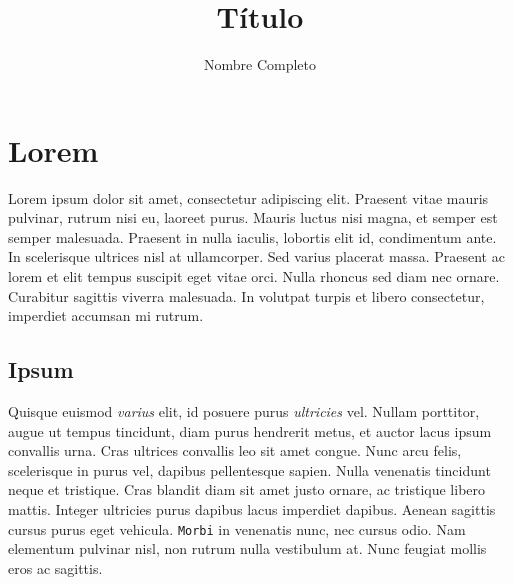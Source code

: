 \documentclass[a4paper,12pt]{article}
\title{Título}
\author{Nombre Completo}
\date{}
\begin{document}



\pagestyle{empty}
\renewcommand{\contentsname}{\centering Índice}
\tableofcontents
\newpage


\pagestyle{fancy}
\cfoot{\thepage}
\rhead{}
\renewcommand{\headrulewidth}{0pt}
\renewcommand{\footrulewidth}{0.4pt}



\section{Lorem}

Lorem ipsum dolor sit amet, consectetur adipiscing elit. Praesent vitae mauris pulvinar, rutrum nisi eu, laoreet purus. Mauris luctus nisi magna, et semper est semper malesuada. Praesent in nulla iaculis, lobortis elit id, condimentum ante. In scelerisque ultrices nisl at ullamcorper. Sed varius placerat massa. Praesent ac lorem et elit tempus suscipit eget vitae orci. Nulla rhoncus sed diam nec ornare. Curabitur sagittis viverra malesuada. In volutpat turpis et libero consectetur, imperdiet accumsan mi rutrum.


\subsection{Ipsum}
Quisque euismod \emph{varius} elit, id posuere purus \emph{ultricies} vel. Nullam porttitor, augue ut tempus tincidunt, diam purus hendrerit metus, et auctor lacus ipsum convallis urna. Cras ultrices convallis leo sit amet congue. Nunc arcu felis, scelerisque in purus vel, dapibus pellentesque sapien. Nulla venenatis tincidunt neque et tristique. Cras blandit diam sit amet justo ornare, ac tristique libero mattis. Integer ultricies purus dapibus lacus imperdiet dapibus. Aenean sagittis cursus purus eget vehicula. \texttt{Morbi} in venenatis nunc, nec cursus odio. Nam elementum pulvinar nisl, non rutrum nulla vestibulum at. Nunc feugiat mollis eros ac sagittis.
\end{document}
